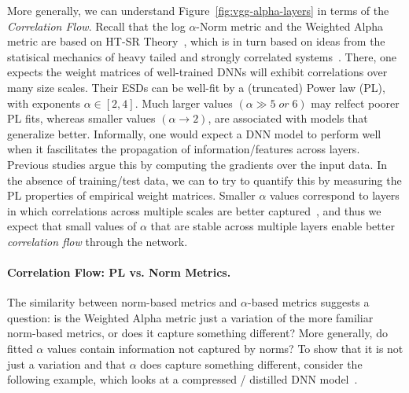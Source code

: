 More generally, we can understand Figure~\ref{fig:vgg-alpha-layers} in terms of the \emph{Correlation Flow}. 
Recall that the log $\alpha$-Norm metric and the Weighted Alpha metric are based on HT-SR Theory~\cite{MM18_TR, MM19_HTSR_ICML, MM20_SDM}, which is in turn based on ideas from the statisical mechanics of heavy tailed and strongly correlated systems~\cite{BouchaudPotters03, SornetteBook, BP11, bun2017}. 
There, one expects the weight matrices of well-trained DNNs will 
exhibit correlations over many size scales. Their ESDs can be well-fit by a (truncated) Power law (PL), with exponents $\alpha\in[2,4]$.
Much larger values $(\alpha\gg 5\;or\;6)$ may relfect poorer PL fits, whereas smaller values $(\alpha\rightarrow 2)$, are associated with models
that generalize better.
Informally, one would expect a DNN model to perform well when it fascilitates the propagation of information/features across layers.
Previous studies argue this by computing the gradients over the input data.
In the absence of training/test data, we can to try to quantify this by measuring the PL properties of empirical weight matrices.
Smaller $\alpha$ values correspond to layers in which correlations across multiple scales are better captured~\cite{MM18_TR,SornetteBook}, and thus we expect that small values of $\alpha$ that are stable across multiple layers enable better \emph{correlation flow} through the network.


\paragraph{Correlation Flow: PL vs. Norm Metrics.}

The similarity between norm-based metrics and $\alpha$-based metrics suggests a question: is the Weighted Alpha metric just a variation of the more familiar norm-based metrics, or does it capture something different?  
More generally, do fitted $\alpha$ values contain information not captured by norms? 
To show that it is not just a variation and that $\alpha$ does capture something different, consider the following example, which looks at a compressed / distilled DNN model~\cite{CWZZ17_TR}.


